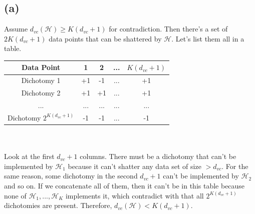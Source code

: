 \documentclass{article}
\begin{document}
	\subsection*{(a)}
		Assume $d_{vc}(\mathcal H) \geq K(d_{vc} + 1)$ for contradiction. Then there's a set of $2K(d_{vc} + 1)$ data points that can be shattered by $\mathcal H$. Let's list them all in a table.\\
		\begin{tabular}{|c|c|c|c|c|}
			\hline
			Data Point & 1 & 2 & ... & $K(d_{vc}+1)$\\
			\hline
			Dichotomy 1 & +1 & -1 & ... & +1\\
			\hline
			Dichotomy 2 & +1 & +1 & ... & +1\\
			\hline
			... & ... & ... & ... & ... \\
			\hline
			Dichotomy $2^{K(d_{vc}+1)}$ & -1 & -1& ... & -1\\
			\hline
		\end{tabular}\\\\
		Look at the first $d_{vc}+1$ columns. There must be a dichotomy that can't be implemented by $\mathcal H_1$ because it can't shatter any data set of size $> d_{vc}$. For the same reason, some dichotomy in the second $d_{vc}+1$ can't be implemented by $\mathcal H_2$ and so on. If we concatenate all of them, then it can't be in this table because none of $\mathcal H_1, ..., \mathcal H_K$ implements it, which contradict with that all $2^{K(d_{vc}+1)}$ dichotomies are present. Therefore, $d_{vc}(\mathcal H) < K(d_{vc} + 1)$.
\end{document}
